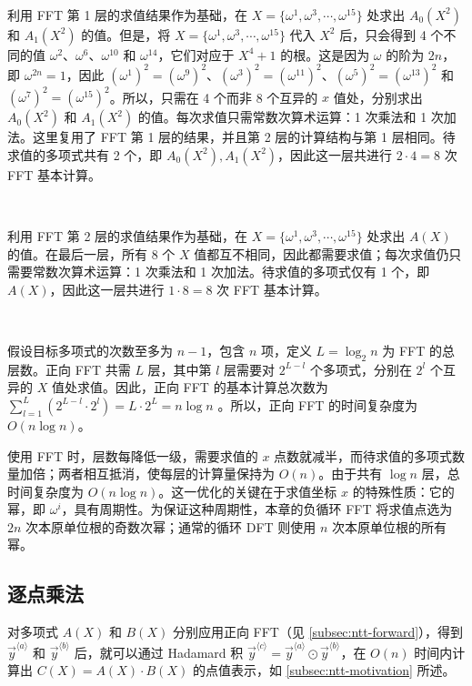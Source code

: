 $ $

利用 FFT 第 1 层的求值结果作为基础，在 $X = \{\omega^1, \omega^3, \cdots, \omega^{15}\}$ 处求出 $A_{0}(X^2)$ 和 $A_{1}(X^2)$ 的值。但是，将 $X = \{\omega^1, \omega^3, \cdots, \omega^{15}\}$ 代入 $X^2$ 后，只会得到 4 个不同的值 $\omega^2$、$\omega^6$、$\omega^{10}$ 和 $\omega^{14}$，它们对应于 $X^4+1$ 的根。这是因为 $\omega$ 的阶为 $2n$，即 $\omega^{2n} = 1$，因此 $(\omega^1)^2 = (\omega^9)^2$、$(\omega^3)^2 = (\omega^{11})^2$、$(\omega^5)^2 = (\omega^{13})^2$ 和 $(\omega^7)^2 = (\omega^{15})^2$。所以，只需在 4 个而非 8 个互异的 $x$ 值处，分别求出 $A_{0}(X^2)$ 和 $A_{1}(X^2)$ 的值。每次求值只需常数次算术运算：1 次乘法和 1 次加法。这里复用了 FFT 第 1 层的结果，并且第 2 层的计算结构与第 1 层相同。待求值的多项式共有 2 个，即 $A_{0}(X^2), A_{1}(X^2)$，因此这一层共进行 $2 \cdot 4 = 8$ 次 FFT 基本计算。

$ $

利用 FFT 第 2 层的求值结果作为基础，在 $X = \{\omega^1, \omega^3, \cdots, \omega^{15}\}$ 处求出 $A(X)$ 的值。在最后一层，所有 8 个 $X$ 值都互不相同，因此都需要求值；每次求值仍只需要常数次算术运算：1 次乘法和 1 次加法。待求值的多项式仅有 1 个，即 $A(X)$，因此这一层共进行 $1 \cdot 8 = 8$ 次 FFT 基本计算。

$ $

假设目标多项式的次数至多为 $n-1$，包含 $n$ 项，定义 $L = \log_2 n$ 为 FFT 的总层数。正向 FFT 共需 $L$ 层，其中第 $l$ 层需要对 $2^{L - l}$ 个多项式，分别在 $2^l$ 个互异的 $X$ 值处求值。因此，正向 FFT 的基本计算总次数为 $\sum_{l=1}^{L}(2^{L-l} \cdot 2^l) = L \cdot 2^L = n \log n$
。所以，正向 FFT 的时间复杂度为 $O(n \log n)$。



使用 FFT 时，层数每降低一级，需要求值的 $x$ 点数就减半，而待求值的多项式数量加倍；两者相互抵消，使每层的计算量保持为 $O(n)$。由于共有 $\log n$ 层，总时间复杂度为 $O(n \log n)$。这一优化的关键在于求值坐标 $x$ 的特殊性质：它的幂，即 $\omega^i$，具有周期性。为保证这种周期性，本章的负循环 FFT 将求值点选为 $2n$ 次本原单位根的奇数次幂；通常的循环 DFT 则使用 $n$ 次本原单位根的所有幂。


\subsection{逐点乘法}
\label{subsec:pointwise-multiplication}

对多项式 $A(X)$ 和 $B(X)$ 分别应用正向 FFT（见 \autoref{subsec:ntt-forward}），得到 $\vec{y}^{\langle a \rangle}$ 和 $\vec{y}^{\langle b \rangle}$ 后，就可以通过 Hadamard 积 $ \vec{y}^{\langle c \rangle} = \vec{y}^{\langle a \rangle} \odot \vec{y}^{\langle b \rangle}$，在 $O(n)$ 时间内计算出 $C(X) = A(X) \cdot B(X)$ 的点值表示，如 \autoref{subsec:ntt-motivation} 所述。

